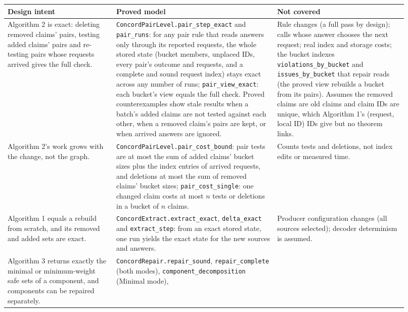 \documentclass[11pt]{article}
\newcommand{\code}[1]{\texttt{#1}}
\begin{document}
\medskip
{\small
\begin{longtable}{@{}>{\raggedright}p{0.25\linewidth}>{\raggedright}p{0.37\linewidth}>{\raggedright\arraybackslash}p{0.30\linewidth}@{}}
\textbf{Design intent} & \textbf{Proved model} & \textbf{Not covered}\\\hline
\endhead
Algorithm 2 is exact: deleting removed claims' pairs, testing added claims'
pairs and re-testing pairs whose requests arrived gives the full check. &
\code{ConcordPairLevel.pair\_step\_exact} and \code{pair\_runs}: for any pair
rule that reads answers only through its reported requests, the whole stored
state (bucket members, unplaced IDs, every pair's outcome and requests, and a
complete and sound request index) stays exact across any number of runs;
\code{pair\_view\_exact}: each bucket's view equals the full check. Proved
counterexamples show stale results when a batch's added claims are not tested
against each other, when a removed claim's pairs are kept, or when arrived
answers are ignored. &
Rule changes (a full pass by design); calls whose answer chooses the next
request; real index and storage costs; the bucket indexes
\code{violations\_by\_bucket} and \code{issues\_by\_bucket} that repair
reads (the proved view rebuilds a bucket from its pairs). Assumes the removed
claims are old claims
and claim IDs are unique, which Algorithm 1's (request, local ID) IDs give but
no theorem links.\\[3pt]
Algorithm 2's work grows with the change, not the graph. &
\code{ConcordPairLevel.pair\_cost\_bound}: pair tests are at most the sum of
added claims' bucket sizes plus the index entries of arrived requests, and
deletions at most the sum of removed claims' bucket sizes;
\code{pair\_cost\_single}: one changed claim costs at most $n$ tests or
deletions in a bucket of $n$ claims. &
Counts tests and deletions, not index edits or measured time.\\[3pt]
Algorithm 1 equals a rebuild from scratch, and its removed and added sets are
exact. &
\code{ConcordExtract.extract\_exact}, \code{delta\_exact} and
\code{extract\_step}: from an exact stored state, one run yields the exact
state for the new sources and answers. &
Producer configuration changes (all sources selected); decoder determinism is
assumed.\\[3pt]
Algorithm 3 returns exactly the minimal or minimum-weight safe sets of a
component, and components can be repaired separately. &
\code{ConcordRepair.repair\_sound}, \code{repair\_complete} (both modes),
\code{component\_decomposition} (Minimal mode),

\end{longtable}}
\end{document}
